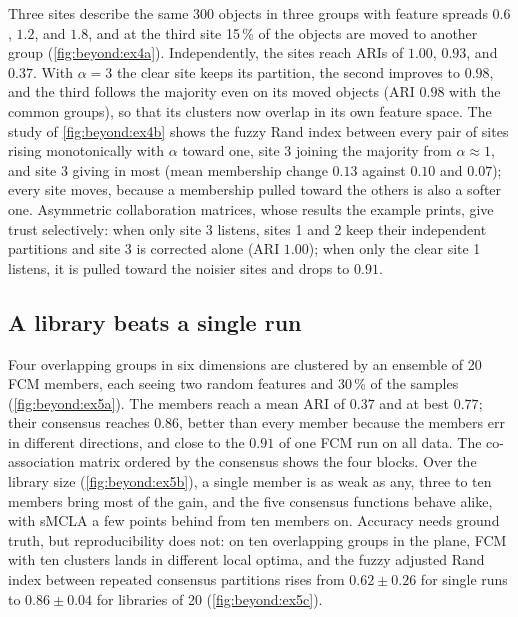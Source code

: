 Three sites describe the same 300 objects in three groups with feature spreads $0.6$, $1.2$, and $1.8$, and at the third site 15\,\% of the objects are moved to another group (\cref{fig:beyond:ex4a}). Independently, the sites reach ARIs of $1.00$, $0.93$, and $0.37$. With $\alpha=3$ the clear site keeps its partition, the second improves to $0.98$, and the third follows the majority even on its moved objects (ARI $0.98$ with the common groups), so that its clusters now overlap in its own feature space. The study of \cref{fig:beyond:ex4b} shows the fuzzy Rand index between every pair of sites rising monotonically with $\alpha$ toward one, site 3 joining the majority from $\alpha\approx1$, and site 3 giving in most (mean membership change $0.13$ against $0.10$ and $0.07$); every site moves, because a membership pulled toward the others is also a softer one. Asymmetric collaboration matrices, whose results the example prints, give trust selectively: when only site 3 listens, sites 1 and 2 keep their independent partitions and site 3 is corrected alone (ARI $1.00$); when only the clear site 1 listens, it is pulled toward the noisier sites and drops to $0.91$.


\subsection{A library beats a single run}

Four overlapping groups in six dimensions are clustered by an ensemble of 20 FCM members, each seeing two random features and 30\,\% of the samples (\cref{fig:beyond:ex5a}). The members reach a mean ARI of $0.37$ and at best $0.77$; their consensus reaches $0.86$, better than every member because the members err in different directions, and close to the $0.91$ of one FCM run on all data. The co-association matrix ordered by the consensus shows the four blocks. Over the library size (\cref{fig:beyond:ex5b}), a single member is as weak as any, three to ten members bring most of the gain, and the five consensus functions behave alike, with sMCLA a few points behind from ten members on. Accuracy needs ground truth, but reproducibility does not: on ten overlapping groups in the plane, FCM with ten clusters lands in different local optima, and the fuzzy adjusted Rand index between repeated consensus partitions rises from $0.62\pm0.26$ for single runs to $0.86\pm0.04$ for libraries of 20 (\cref{fig:beyond:ex5c}).

